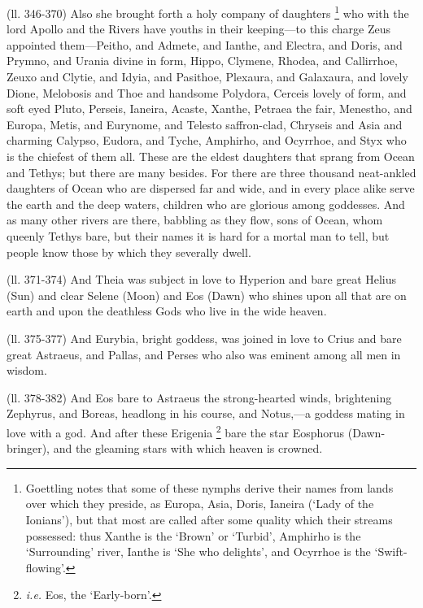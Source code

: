 (ll. 346-370) Also she brought forth a holy company of daughters \footnote{Goettling notes that some
of these nymphs derive their names from lands over which they preside, as
Europa, Asia, Doris, Ianeira (‘Lady of the Ionians’), but that most
are called after some quality which their streams possessed: thus Xanthe is the
‘Brown’ or ‘Turbid’, Amphirho is the
‘Surrounding’ river, Ianthe is ‘She who delights’, and
Ocyrrhoe is the ‘Swift-flowing’.} who with the lord Apollo and the
Rivers have youths in their keeping—to this charge Zeus appointed
them—Peitho, and Admete, and Ianthe, and Electra, and Doris, and Prymno,
and Urania divine in form, Hippo, Clymene, Rhodea, and Callirrhoe, Zeuxo and
Clytie, and Idyia, and Pasithoe, Plexaura, and Galaxaura, and lovely Dione,
Melobosis and Thoe and handsome Polydora, Cerceis lovely of form, and soft eyed
Pluto, Perseis, Ianeira, Acaste, Xanthe, Petraea the fair, Menestho, and
Europa, Metis, and Eurynome, and Telesto saffron-clad, Chryseis and Asia and
charming Calypso, Eudora, and Tyche, Amphirho, and Ocyrrhoe, and Styx who is
the chiefest of them all. These are the eldest daughters that sprang from Ocean
and Tethys; but there are many besides. For there are three thousand
neat-ankled daughters of Ocean who are dispersed far and wide, and in every
place alike serve the earth and the deep waters, children who are glorious
among goddesses. And as many other rivers are there, babbling as they flow,
sons of Ocean, whom queenly Tethys bare, but their names it is hard for a
mortal man to tell, but people know those by which they severally dwell.

(ll. 371-374) And Theia was subject in love to Hyperion and bare great Helius
(Sun) and clear Selene (Moon) and Eos (Dawn) who shines upon all that are on
earth and upon the deathless Gods who live in the wide heaven.

(ll. 375-377) And Eurybia, bright goddess, was joined in love to Crius and bare
great Astraeus, and Pallas, and Perses who also was eminent among all men in
wisdom.

(ll. 378-382) And Eos bare to Astraeus the strong-hearted winds, brightening
Zephyrus, and Boreas, headlong in his course, and Notus,—a goddess mating
in love with a god. And after these Erigenia \footnote{\emph{i.e.} Eos, the
‘Early-born’.} bare the
star Eosphorus (Dawn-bringer), and the gleaming stars with which heaven is
crowned.

